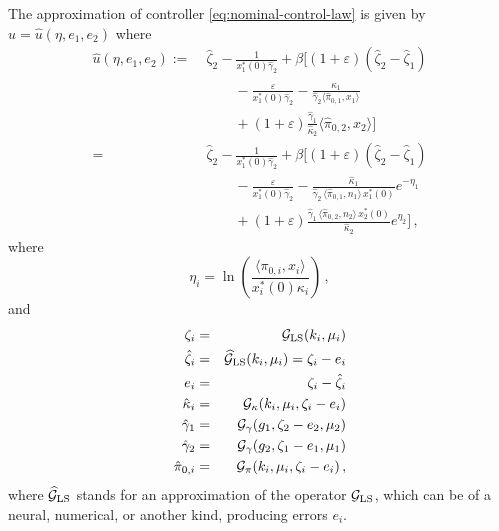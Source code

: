 \documentclass[journal,twoside,web]{ieeecolor}
\begin{document}
The approximation of controller \eqref{eq:nominal-control-law} is given by $u = \hat{u}(\eta, e_1, e_2)$ where 
\begin{align}
\label{eq-eta-cont-PDE}
\hat u(\eta,e_1,e_2)
:=\;& \hat\zeta_2-\frac{1}{x_1^*(0)\hat\gamma_2}
+\beta\bigg[
(1+\varepsilon)(\hat\zeta_2-\hat\zeta_1)
\nonumber \\ & \qquad  -\frac{\varepsilon}{x_1^*(0)\hat\gamma_2}
-\frac{\hat\kappa_1}{\hat\gamma_2\langle \hat\pi_{0,1},x_1\rangle}
\nonumber \\ &\qquad  +(1+\varepsilon)\frac{\hat\gamma_1}{\hat\kappa_2}\langle \hat\pi_{0,2},x_2\rangle
\bigg]
\\
=\;& \hat\zeta_2-\frac{1}{x_1^*(0)\hat\gamma_2}
+\beta\bigg[
(1+\varepsilon)(\hat\zeta_2-\hat\zeta_1)
\nonumber \\ & \qquad -\frac{\varepsilon}{x_1^*(0)\hat\gamma_2}
-\frac{\hat\kappa_1}
{\hat\gamma_2\,\langle \hat\pi_{0,1},n_1\rangle\,x_1^*(0)}e^{-\eta_1}
\nonumber \\ & \qquad +(1+\varepsilon)\frac{\hat\gamma_1\,\langle \hat\pi_{0,2},n_2\rangle\,x_2^*(0)}
{\hat\kappa_2}e^{\eta_2}
\bigg]
\,,
\label{eq-eta-cont}
\end{align}
where
\begin{equation}
\eta_i = \ln\left(\frac{\langle \pi_{0,i}, x_i\rangle}{x_i^*(0) \kappa_i}\right)\,, 
\end{equation}
and
\begin{eqnarray}
\zeta_i &=&  \mathcal{G}_{\rm LS}( k_i,\mu_i) \\
\hat\zeta_i &=& \widehat{\mathcal{G}}_{\rm LS}( k_i,\mu_i) = \zeta_i-e_i\\
e_i &=& \zeta_i-\hat\zeta_i\\
\label{eq-kappahat}
\hat\kappa_i &=& 
\mathcal{G}_\kappa( k_i,  \mu_i,\zeta_i-e_i) \\
\label{eq-gamma1hat}
\hat\gamma_1 &=& \mathcal{G}_\gamma( g_1, \zeta_2-e_2, \mu_2)\\
\label{eq-gamma2hat}
\hat\gamma_2 &=& \mathcal{G}_\gamma( g_2, \zeta_1-e_1, \mu_1)\\
\label{eq-pihat}
\hat \pi_{0,i} &=& \mathcal{G}_\pi(k_i, \mu_i, \zeta_i-e_i)\,,
\end{eqnarray}
where $\widehat{\mathcal{G}}_{\rm LS}$ stands for an approximation of the operator ${\mathcal{G}}_{\rm LS}$, which can be of a neural, numerical, or another kind, producing errors $e_i$. 
\end{document}
